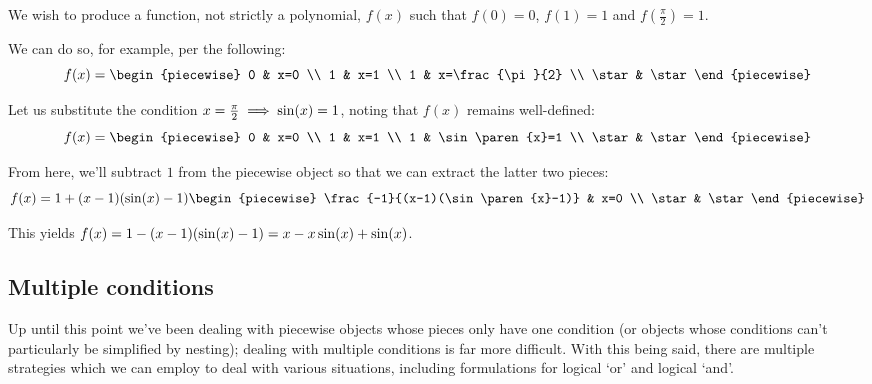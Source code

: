 \begin{example}
    We wish to produce a function, not strictly a polynomial, $f(x)$ such that $f(0)=0$, $f(1)=1$ and $f(\frac{\pi}{2})=1$.

    We can do so, for example, per the following:
    $$
        f(x) = \begin{piecewise}
            0 & x=0 \\
            1 & x=1 \\
            1 & x=\frac{\pi}{2} \\
            \star & \star
        \end{piecewise}
    $$

    Let us substitute the condition $x=\frac{\pi}{2}\implies \sin(x)=1$, noting that $f(x)$ remains well-defined:
    $$
        f(x) = \begin{piecewise}
            0 & x=0 \\
            1 & x=1 \\
            1 & \sin\paren{x}=1 \\
            \star & \star
        \end{piecewise}
    $$

    From here, we'll subtract $1$ from the piecewise object so that we can extract the latter two pieces:
    $$
        f(x) = 1+(x-1)(\sin\paren{x}-1)\begin{piecewise}
            \frac{-1}{(x-1)(\sin\paren{x}-1)} & x=0 \\
            \star & \star
        \end{piecewise}
    $$

    This yields $f(x)=1-(x-1)(\sin(x)-1)=x-x\sin(x)+\sin(x)$.
\end{example}

\subsection{Multiple conditions}
\label{section:multiple_conditions}
Up until this point we've been dealing with piecewise objects whose pieces only have one condition (or objects whose conditions can't particularly be simplified by nesting); dealing with multiple conditions is far more difficult. With this being said, there are multiple strategies which we can employ to deal with various situations, including formulations for logical `or' and logical `and'.

